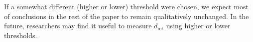 \documentclass{article} %
\newcommand{\dint}{d_{\mathrm{int}}}
\newcommand{\dintn}{d_{\mathrm{int90}}}
\begin{document}
%
%
%
%
%
If a somewhat different (higher or lower) threshold were chosen, we expect most of conclusions in the rest of the paper to remain qualitatively unchanged. %
In the future, researchers may find it useful to measure $\dint$ using higher or lower thresholds.







\end{document}
